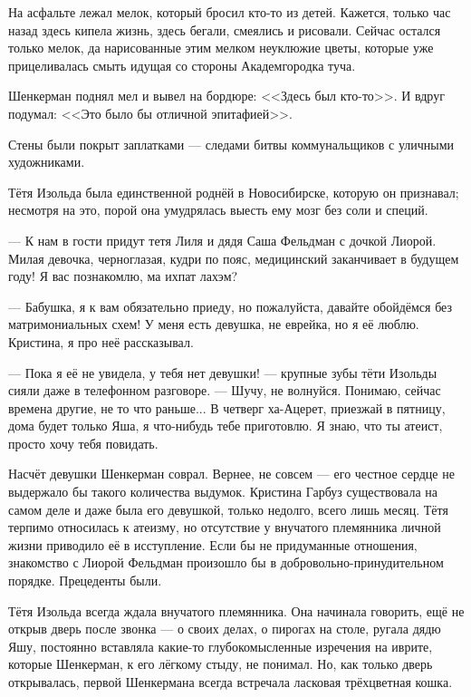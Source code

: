 На асфальте лежал мелок, который бросил кто-то из детей.
Кажется, только час назад здесь кипела жизнь, здесь бегали, смеялись и рисовали.
Сейчас остался только мелок, да нарисованные этим мелком неуклюжие цветы, которые уже прицеливалась смыть идущая со стороны Академгородка туча.

Шенкерман поднял мел и вывел на бордюре: <<Здесь был кто-то>>.
И вдруг подумал: <<Это было бы отличной эпитафией>>.

\asterism

Стены были покрыт заплатками --- следами битвы коммунальщиков с уличными художниками.

\textspace

Тётя Изольда была единственной роднёй в Новосибирске, которую он признавал;
несмотря на это, порой она умудрялась выесть ему мозг без соли и специй.

--- К нам в гости придут тетя Лиля и дядя Саша Фельдман с дочкой Лиорой.
Милая девочка, черноглазая, кудри по пояс, медицинский заканчивает в будущем году!
Я вас познакомлю, ма ихпат лахэм?

--- Бабушка, я к вам обязательно приеду, но пожалуйста, давайте обойдёмся без матримониальных схем!
У меня есть девушка, не еврейка, но я её люблю.
Кристина, я про неё рассказывал.

--- Пока я её не увидела, у тебя нет девушки! --- крупные зубы тёти Изольды сияли даже в телефонном разговоре.
--- Шучу, не волнуйся.
Понимаю, сейчас времена другие, не то что раньше...
В четверг ха-Ацерет, приезжай в пятницу, дома будет только Яша, я что-нибудь тебе приготовлю.
Я знаю, что ты атеист, просто хочу тебя повидать.

Насчёт девушки Шенкерман соврал.
Вернее, не совсем --- его честное сердце не выдержало бы такого количества выдумок.
Кристина Гарбуз существовала на самом деле и даже была его девушкой, только недолго, всего лишь месяц.
Тётя терпимо относилась к атеизму, но отсутствие у внучатого племянника личной жизни приводило её в исступление.
Если бы не придуманные отношения, знакомство с Лиорой Фельдман произошло бы в добровольно-принудительном порядке.
Прецеденты были.

\asterism

\textspace

Тётя Изольда всегда ждала внучатого племянника.
Она начинала говорить, ещё не открыв дверь после звонка --- о своих делах, о пирогах на столе, ругала дядю Яшу, постоянно вставляла какие-то глубокомысленные изречения на иврите, которые Шенкерман, к его лёгкому стыду, не понимал.
Но, как только дверь открывалась, первой Шенкермана всегда встречала ласковая трёхцветная кошка.

